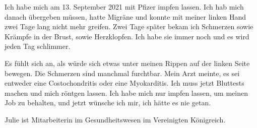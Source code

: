 Ich habe mich am 13. September 2021 mit Pfizer impfen lassen. Ich hab mich
danach übergeben müssen, hatte Migräne und konnte mit meiner linken Hand zwei
Tage lang nicht mehr greifen. Zwei Tage später bekam ich Schmerzen sowie Krämpfe
in der Brust, sowie Herzklopfen. Ich habe sie immer noch und es wird jeden Tag
schlimmer.

Es fühlt sich an, als würde sich etwas unter meinen Rippen auf der linken Seite
bewegen. Die Schmerzen sind manchmal furchtbar. Mein Arzt meinte, es sei
entweder eine Costochondritis oder eine Myokarditis. Ich muss jetzt Bluttests
machen und mich röntgen lassen. Ich habe mich nur impfen lassen, um meinen Job
zu behalten, und jetzt wünsche ich mir, ich hätte es nie getan.

Julie ist Mitarbeiterin im Gesundheitswesen im Vereinigten Königreich.
